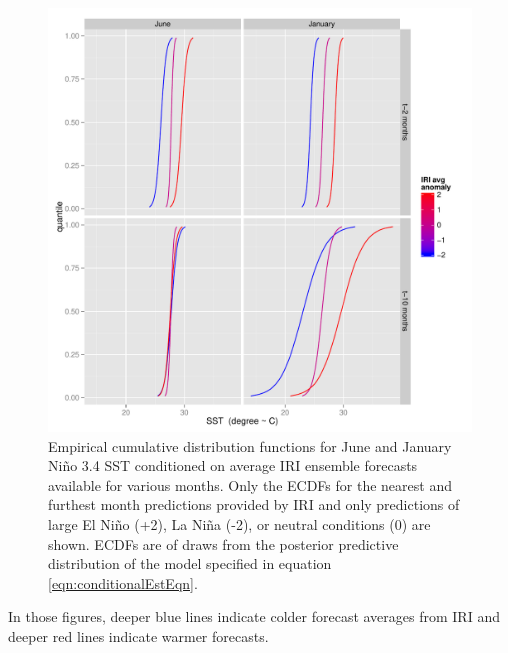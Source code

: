 \documentclass[authoryear]{article}
\begin{document}
\begin{figure}[!htbp]
  \includegraphics[width=\linewidth]{Pricingfigs/conditionalCDFsIllustrativeExamplesTradConfigSimple}
  \caption{Empirical cumulative distribution functions for June and January Ni\~no 3.4 SST conditioned on average IRI ensemble forecasts available for various months. Only the ECDFs for the nearest and furthest month predictions provided by IRI and only predictions of large El Ni\~no (+2), La Ni\~na (-2), or neutral conditions (0) are shown. ECDFs are of draws from the posterior predictive distribution of the model specified in equation \ref{eqn:conditionalEstEqn}.}
   \label{fig:conditionalCDFsIllustrativeExamplesTradConfigSimple}
\end{figure}

In those figures, deeper blue lines indicate colder forecast averages from IRI and deeper red lines indicate warmer forecasts.
 

\end{document}

